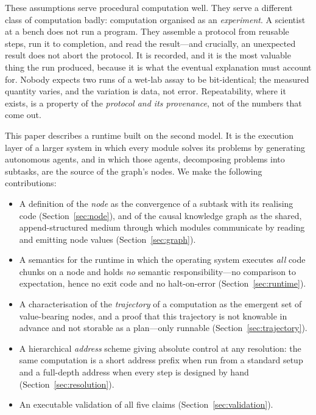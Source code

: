 \documentclass[11pt,a4paper,twocolumn]{article}
\theoremstyle{definition}
\begin{document}
These assumptions serve procedural computation well. They serve a different
class of computation badly: computation organised as an \emph{experiment}. A
scientist at a bench does not run a program. They assemble a protocol from
reusable steps, run it to completion, and read the result---and crucially, an
unexpected result does not abort the protocol. It is recorded, and it is the
most valuable thing the run produced, because it is what the eventual
explanation must account for. Nobody expects two runs of a wet-lab assay to be
bit-identical; the measured quantity varies, and the variation is data, not
error. Repeatability, where it exists, is a property of the \emph{protocol and
its provenance}, not of the numbers that come out.

This paper describes a runtime built on the second model. It is the execution
layer of a larger system in which every module solves its problems by
generating autonomous agents, and in which those agents, decomposing problems
into subtasks, are the source of the graph's nodes. We make the following
contributions:

\begin{itemize}[leftmargin=1.4em]
  \item A definition of the \emph{node} as the convergence of a subtask with
  its realising code (Section~\ref{sec:node}), and of the causal knowledge
  graph as the shared, append-structured medium through which modules
  communicate by reading and emitting node values (Section~\ref{sec:graph}).
  \item A semantics for the runtime in which the operating system executes
  \emph{all} code chunks on a node and holds \emph{no} semantic
  responsibility---no comparison to expectation, hence no exit code and no
  halt-on-error (Section~\ref{sec:runtime}).
  \item A characterisation of the \emph{trajectory} of a computation as the
  emergent set of value-bearing nodes, and a proof that this trajectory is not
  knowable in advance and not storable as a plan---only runnable
  (Section~\ref{sec:trajectory}).
  \item A hierarchical \emph{address} scheme giving absolute control at any
  resolution: the same computation is a short address prefix when run from a
  standard setup and a full-depth address when every step is designed by hand
  (Section~\ref{sec:resolution}).
  \item An executable validation of all five claims
  (Section~\ref{sec:validation}).
\end{itemize}
\end{document}
